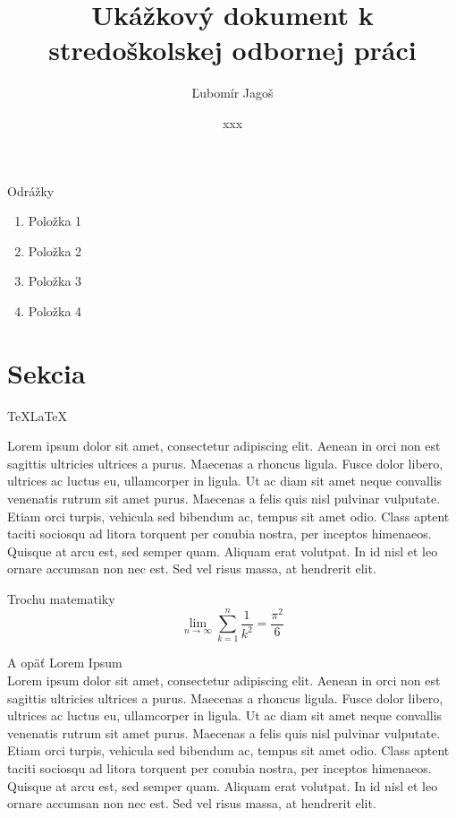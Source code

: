 \documentclass[]{article}
\title{ Ukážkový dokument k stredoškolskej odbornej práci }
\author{Ľubomír Jagoš}
\date{xxx}
\begin{document}
  \maketitle

  Odrážky
  \begin{enumerate}
		\item Položka 1
		\item Položka 2
		\item Položka 3
		\item Položka 4
  \end{enumerate}
  
  \section{Sekcia}
	\TeX \LaTeX
	
	Lorem ipsum dolor sit amet, consectetur adipiscing elit. Aenean in orci non est sagittis
	ultricies ultrices a purus. Maecenas a rhoncus ligula. Fusce dolor libero, ultrices ac
	luctus eu, ullamcorper in ligula. Ut ac diam sit amet neque convallis venenatis rutrum
	sit amet purus. Maecenas a felis quis nisl pulvinar vulputate. Etiam orci turpis, vehicula
	sed bibendum ac, tempus sit amet odio. Class aptent taciti sociosqu ad litora torquent per
	conubia nostra, per inceptos himenaeos. Quisque at arcu est, sed semper quam. Aliquam erat
	volutpat. In id nisl et leo ornare accumsan non nec est. Sed vel risus massa, at hendrerit
	elit.
	
	\large{Trochu matematiky}
	\begin{displaymath}
	\lim_{n \to \infty}
	\sum_{k=1}^n \frac{1}{k^2} = \frac{\pi^2}{6}
	\end{displaymath}
	
	\newpage
	
	A opäť Lorem Ipsum \\
	
	Lorem ipsum dolor sit amet, consectetur adipiscing elit. Aenean in orci non est sagittis
	ultricies ultrices a purus. Maecenas a rhoncus ligula. Fusce dolor libero, ultrices ac
	luctus eu, ullamcorper in ligula. Ut ac diam sit amet neque convallis venenatis rutrum
	sit amet purus. Maecenas a felis quis nisl pulvinar vulputate. Etiam orci turpis, vehicula
	sed bibendum ac, tempus sit amet odio. Class aptent taciti sociosqu ad litora torquent per
	conubia nostra, per inceptos himenaeos. Quisque at arcu est, sed semper quam. Aliquam erat
	volutpat. In id nisl et leo ornare accumsan non nec est. Sed vel risus massa, at hendrerit
	elit.
	
\end{document}
